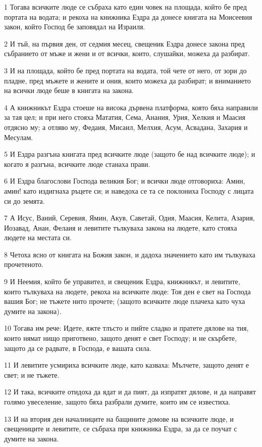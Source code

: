 \par 1 Тогава всичките люде се събраха като един човек на площада, който бе пред портата на водата; и рекоха на книжника Ездра да донесе книгата на Моисеевия закон, който Господ бе заповядал на Израиля.
\par 2 И тъй, на първия ден, от седмия месец, свещеник Ездра донесе закона пред събранието от мъже и жени и от всички, които, слушайки, можеха да разбират.
\par 3 И на площада, който бе пред портата на водата, той чете от него, от зори до пладне, пред мъжете и жените и ония, които можеха да разбират; и вниманието на всички люде беше в книгата на закона.
\par 4 А книжникът Ездра стоеше на висока дървена платформа, която бяха направили за тая цел; и при него стояха Мататия, Сема, Анания, Урия, Хелкия и Маасия отдясно му; а отляво му, Федаия, Мисаил, Мелхия, Асум, Асвадана, Захария и Месулам.
\par 5 И Ездра разгъна книгата пред всичките люде (защото бе над всичките люде); и когато я разгъна, всичките люде станаха прави.
\par 6 И Ездра благослови Господа великия Бог; и всички люде отговориха: Амин, амин! като издигнаха ръцете си; и наведоха се та се поклониха Господу с лицата си до земята.
\par 7 А Исус, Ваний, Серевия, Ямин, Акув, Саветай, Одия, Маасия, Келита, Азария, Иозавад, Анан, Фелаия и левитите тълкуваха закона на людете, като стояха людете на местата си.
\par 8 Четоха ясно от книгата на Божия закон, и дадоха значението като им тълкуваха прочетеното.
\par 9 И Неемия, който бе управител, и свещеник Ездра, книжникът, и левитите, които тълкуваха на людете, рекоха на всичките люде: Тоя ден е свет на Господа вашия Бог; не тъжете нито прочете; (защото всичките люде плачеха като чуха думите на закона).
\par 10 Тогава им рече: Идете, яжте тлъсто и пийте сладко и пратете дялове на тия, които нямат нищо приготвено, защото денят е свет Господу; и не скърбете, защото да се радвате, в Господа, е вашата сила.
\par 11 И левитите усмириха всичките люде, като казваха: Мълчете, защото денят е свет; и не тъжете.
\par 12 И така, всичките отидоха да ядат и да пият, да изпратят дялове, и да направят голямо увеселение, защото бяха разбрали думите, които им се известиха.
\par 13 И на втория ден началниците на бащините домове на всичките люде, и свещениците и левитите, се събраха при книжника Ездра, за да се поучат с думите на закона.

